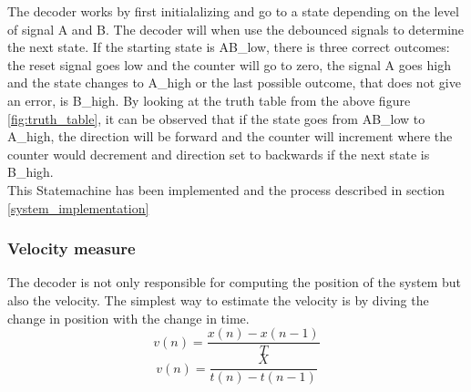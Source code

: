 \documentclass[../../../main]{subfiles}
\begin{document}
The decoder works by first initialalizing and go to a state depending on the level of signal A and B. The decoder will when use the debounced signals to determine the next state. If the starting state is AB\_low, there is three correct outcomes: the reset signal goes low and the counter will go to zero, the signal A goes high and the state changes to A\_high or the last possible outcome, that does not give an error, is B\_high. By looking at the truth table from the above figure \ref{fig:truth_table}, it can be observed that if the state goes from AB\_low to A\_high, the direction will be forward and the counter will increment where the counter would decrement and direction set to backwards if the next state is B\_high.\\ This Statemachine has been implemented and the process described in section \ref{system_implementation}


\begin{figure}[H]
  \centering
  \def\svgwidth{\columnwidth}
  \fontsize{9}{9}\selectfont
  
  \caption{}
\end{figure}


\subsubsection{Velocity measure}
The decoder is not only responsible for computing the position of the system but also the velocity. The simplest way to estimate the velocity is by diving the change in position with the change in time.
\begin{equation}
v(n) = \frac{x(n)-x(n-1)}{T}
\end{equation}
\begin{equation}
  v(n) = \frac{X}{t(n)-t(n-1)}
\end{equation}
\end{document}
